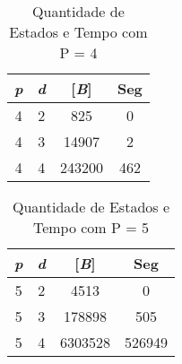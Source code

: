 \begin{table}[ht]
\centering
\begin{tabular}{|c|c|c|c|}
\hline
\emph{p} & \emph{d} & [\emph{B}] & Seg\tabularnewline
\hline
\hline
4 & 2 & 825 & 0\tabularnewline
\hline
4 & 3 & 14907 & 2\tabularnewline
\hline
4 & 4 & 243200 & 462\tabularnewline
\hline
\end{tabular}
\caption{Quantidade de Estados e Tempo com P = 4}
\label{tab:quantidade-de-estados-e-tempo-com-p-4}
\end{table}

\begin{table}[ht]
\centering
\begin{tabular}{|c|c|c|c|}
\hline
\emph{p} & \emph{d} & [\emph{B}] & Seg\tabularnewline
\hline
\hline
5 & 2 & 4513 & 0\tabularnewline
\hline
5 & 3 & 178898 & 505\tabularnewline
\hline
5 & 4 & 6303528 & 526949\tabularnewline
\hline
\end{tabular}
\caption{Quantidade de Estados e Tempo com P = 5}
\label{tab:quantidade-de-estados-e-tempo-com-p-5}
\end{table}
